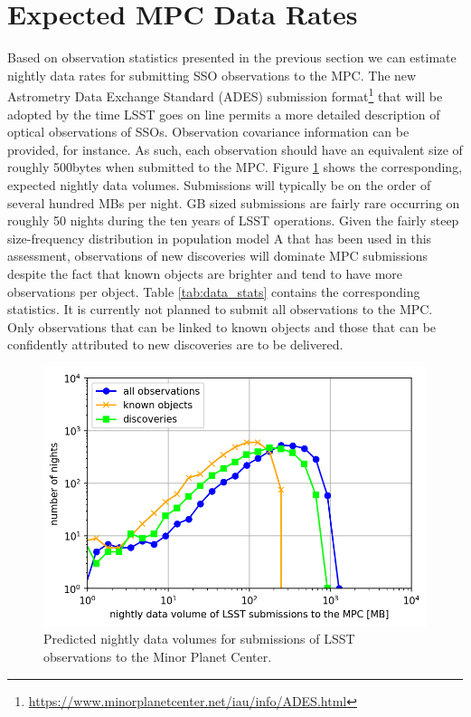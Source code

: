 \section{Expected \gls{MPC} Data Rates}\label{sec:data}
Based on observation statistics presented in the previous section we can estimate nightly data rates for submitting \gls{SSO} observations to the \gls{MPC}. The new Astrometry Data Exchange Standard (\gls{ADES}) submission format\footnote{\url{https://www.minorplanetcenter.net/iau/info/ADES.html}} that will be adopted by the time \gls{LSST} goes on line permits a more detailed description of optical observations of SSOs. Observation covariance information can be provided, for instance. As such, each observation should have an equivalent size of roughly 500bytes when submitted to the \gls{MPC}. Figure \ref{fig:data} shows the corresponding, expected nightly data volumes. Submissions will typically be on the order of several hundred MBs per night. \gls{GB} sized submissions are fairly rare occurring on roughly 50 nights during the ten years of \gls{LSST} operations. Given the fairly steep size-frequency distribution in population model A that has been used in this assessment, observations of new discoveries will dominate \gls{MPC} submissions despite the fact that known objects are brighter and tend to have more observations per object. Table \ref{tab:data_stats} contains the corresponding statistics. It is currently not planned to submit all observations to the \gls{MPC}. Only observations
that can be linked to known objects and those that can be confidently attributed to new discoveries are to be delivered. 


\begin{figure}[tb!]
\begin{center}
\includegraphics[width=0.70\linewidth]{figs/data2.png}
\end{center}
\caption{Predicted nightly data volumes for submissions of \gls{LSST} observations to the Minor Planet \gls{Center}.}
\label{fig:data}       %
\end{figure}
\clearpage

